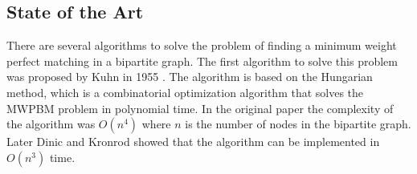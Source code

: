 \begin{comment}
In general, even if all the coefficients of the constraint matrix in a linear program are either 0 or 1, the extreme points of a linear program are not guaranteed to all have integral coordinates. This is not surprising since the general integer programming problem is NP-hard, while linear programming is solvable in polynomial time. Consequently, there is no guarantee that the value $Z_{IP}$ of an integer program is equal to the value $Z_{LP}$ of its LP relaxation. However, since the integer program is more constrained than the relaxation, we always have $Z_{IP} \geq Z_{LP}$, implying that $Z_{LP}$ is a lower bound on $Z_{IP}$ for a minimization problem. Moreover, if an optimal solution to a linear programming relaxation is integral, then it must also be an optimal solution to the integer program.

In our problem, the constraint matrix has a special form that leads to the following result: 

\begin{theorem}
    Any extreme point of $P$ is a $0-1$ vector; hence, it is the incidence vector of a perfect matching.
\end{theorem}

Consequently, the polytope

\begin{equation}
    \begin{aligned}
        \{ x: & \sum_{j \in V_2} x_{ij} = 1, \quad \forall i \in V_1, \\
        & \sum_{i \in V_1} x_{ij} = 1, \quad \forall j \in V_2, \\
        & 0 \leq x_{ij} \leq 1, \quad \forall (i, j) \in E \}
    \end{aligned}
\end{equation}

is called the bipartite perfect matching polytope (see Lecture notes by \cite{goemans2009matching}). 
\end{comment}

\subsection{State of the Art} \label{sec:mwpbm_solutions}
There are several algorithms to solve the problem of finding a minimum weight perfect matching in a bipartite graph. The first algorithm to solve this problem was proposed by Kuhn in 1955 \cite{kuhn1955hungarian}. The algorithm is based on the Hungarian method, which is a combinatorial optimization algorithm that solves the MWPBM problem in polynomial time. In the original paper the complexity of the algorithm was $O(n^4)$ where $n$ is the number of nodes in the bipartite graph. Later Dinic and Kronrod \cite{dinic1969algorithm} showed that the algorithm can be implemented in $O(n^3)$ time.


